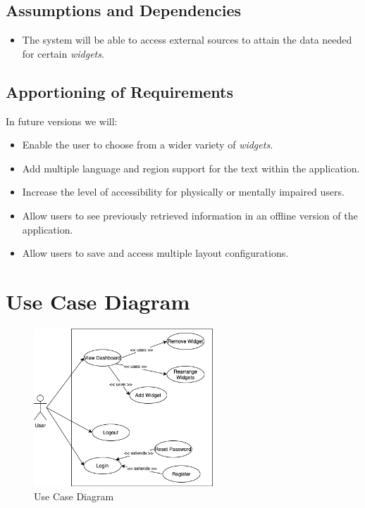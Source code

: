 \documentclass{article}
\begin{document}
	\subsection{Assumptions and Dependencies}
	\label{sub:assumptions_and_dependencies}
	\begin{itemize}
		\item The system will be able to access external sources to attain the data needed for certain \textit{widgets}.
		
	\end{itemize}
	
	\subsection{Apportioning of Requirements}
	\label{sub:apportioning_of_requirements}
	In future versions we will:  
	\begin{itemize}
		\item Enable the user to choose from a wider variety of \textit{widgets}.
		\item Add multiple language and region support for the text within the application.
		\item Increase the level of accessibility for physically or mentally impaired users.
		\item Allow users to see previously retrieved information in an offline version of the application.
		\item Allow users to save and access multiple layout configurations.
	\end{itemize}
	
	\newpage
	\section{Use Case Diagram}
	\label{sec:use_case_diagram}
	\begin{figure}[h!]
		\begin{center}
			\includegraphics[width=0.6\textwidth]{Usecase.png}
		\end{center}
		\caption{Use Case Diagram}
		\label{fig:use case diagram}
	\end{figure}
	
\end{document}
